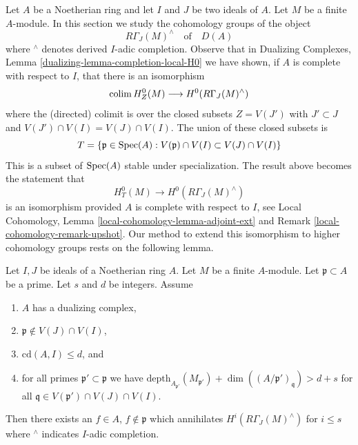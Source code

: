 \noindent
Let $A$ be a Noetherian ring and let $I$ and $J$ be two ideals of $A$.
Let $M$ be a finite $A$-module. In this section we study the
cohomology groups of the object
$$
R\Gamma_J(M)^\wedge
\quad\text{of}\quad
D(A)
$$
where ${}^\wedge$ denotes derived $I$-adic completion. Observe that in
Dualizing Complexes, Lemma \ref{dualizing-lemma-completion-local-H0}
we have shown, if $A$ is complete with respect to $I$,
that there is an isomorphism
$$
\mathop{\mathrm{colim}}\nolimits H^0_Z(M) \longrightarrow H^0(R\Gamma_J(M)^\wedge)
$$
where the (directed) colimit is over the closed subsets $Z = V(J')$
with $J' \subset J$ and $V(J') \cap V(I) = V(J) \cap V(I)$.
The union of these closed subsets is
\begin{equation}
\label{equation-associated-subset}
T = \{\mathfrak p \in \mathop{\mathrm{Spec}}(A) :
V(\mathfrak p) \cap V(I) \subset V(J) \cap V(I)\}
\end{equation}
This is a subset of $\mathop{\mathrm{Spec}}(A)$ stable under specialization.
The result above becomes the statement that
$$
H^0_T(M) \longrightarrow H^0(R\Gamma_J(M)^\wedge)
$$
is an isomorphism provided $A$ is complete with respect to $I$, see
Local Cohomology, Lemma \ref{local-cohomology-lemma-adjoint-ext} and
Remark \ref{local-cohomology-remark-upshot}.
Our method to extend this isomorphism to higher cohomology groups
rests on the following lemma.

\begin{lemma}
\label{lemma-kill-completion-general}
Let $I, J$ be ideals of a Noetherian ring $A$.
Let $M$ be a finite $A$-module. Let $\mathfrak p \subset A$ be a prime.
Let $s$ and $d$ be integers. Assume
\begin{enumerate}
\item $A$ has a dualizing complex,
\item $\mathfrak p \not \in V(J) \cap V(I)$,
\item $\text{cd}(A, I) \leq d$, and
\item for all primes $\mathfrak p' \subset \mathfrak p$
we have
$\text{depth}_{A_{\mathfrak p'}}(M_{\mathfrak p'}) +
\dim((A/\mathfrak p')_\mathfrak q) > d + s$
for all $\mathfrak q \in V(\mathfrak p') \cap V(J) \cap V(I)$.
\end{enumerate}
Then there exists an $f \in A$, $f \not \in \mathfrak p$ which annihilates
$H^i(R\Gamma_J(M)^\wedge)$ for $i \leq s$ where ${}^\wedge$
indicates $I$-adic completion.
\end{lemma}

